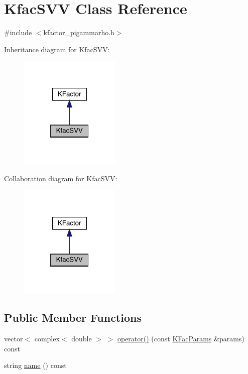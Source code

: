 \hypertarget{classKfacSVV}{}\section{Kfac\+S\+VV Class Reference}
\label{classKfacSVV}


{\ttfamily \#include $<$kfactor\+\_\+pigammarho.\+h$>$}



Inheritance diagram for Kfac\+S\+VV\+:\nopagebreak
\begin{figure}[H]
\begin{center}
\leavevmode
\includegraphics[width=136pt]{d9/d5e/classKfacSVV__inherit__graph}
\end{center}
\end{figure}


Collaboration diagram for Kfac\+S\+VV\+:\nopagebreak
\begin{figure}[H]
\begin{center}
\leavevmode
\includegraphics[width=136pt]{d5/d86/classKfacSVV__coll__graph}
\end{center}
\end{figure}
\subsection*{Public Member Functions}
\begin{DoxyCompactItemize}
\item 
vector$<$ complex$<$ double $>$ $>$ \mbox{\hyperlink{classKfacSVV_acb7f7f6bf0957694a73271704bb0569f}{operator()}} (const \mbox{\hyperlink{classKFacParams}{K\+Fac\+Params}} \&params) const
\item 
string \mbox{\hyperlink{classKfacSVV_ad7ab40ec924a678cd785a9743e676d6c}{name}} () const
\end{DoxyCompactItemize}


